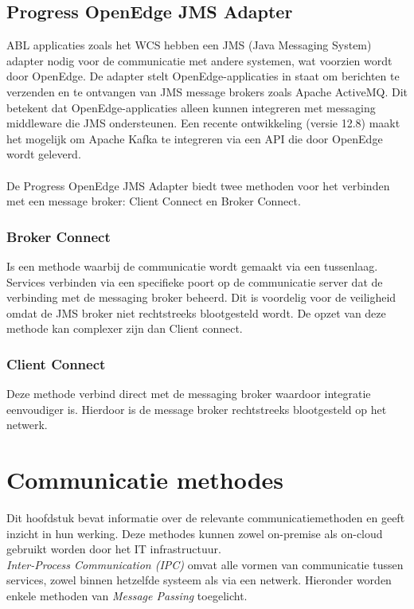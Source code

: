 \subsection{Progress OpenEdge JMS Adapter}
ABL applicaties zoals het WCS hebben een JMS (Java Messaging System) adapter nodig voor de communicatie met andere systemen, wat voorzien wordt door OpenEdge.
De adapter stelt OpenEdge-applicaties in staat om berichten te verzenden en te ontvangen van JMS message brokers zoals Apache ActiveMQ. 
Dit betekent dat OpenEdge-applicaties alleen kunnen integreren met messaging middleware die JMS ondersteunen. 
Een recente ontwikkeling (versie 12.8) maakt het mogelijk om Apache Kafka te integreren via een API die door OpenEdge wordt geleverd.
\\\\
De Progress OpenEdge JMS Adapter biedt twee methoden voor het verbinden met een message broker: Client Connect en Broker Connect.
\subsubsection{Broker Connect}
Is een methode waarbij de communicatie wordt gemaakt via een tussenlaag. Services verbinden via een specifieke poort op de communicatie server
dat de verbinding met de messaging broker beheerd. Dit is voordelig voor de veiligheid omdat de JMS broker niet rechtstreeks blootgesteld wordt.
De opzet van deze methode kan complexer zijn dan Client connect.

\subsubsection{Client Connect}
Deze methode verbind direct met de messaging broker waardoor integratie eenvoudiger is. 
Hierdoor is de message broker rechtstreeks blootgesteld op het netwerk.

\section{Communicatie methodes}
Dit hoofdstuk bevat informatie over de relevante communicatiemethoden en geeft inzicht in hun werking.
Deze methodes kunnen zowel on-premise als on-cloud gebruikt worden door het IT infrastructuur.
\\
\emph{Inter-Process Communication (IPC)} omvat alle vormen van communicatie tussen services, 
zowel binnen hetzelfde systeem als via een netwerk. 
Hieronder worden enkele methoden van \emph{Message Passing} toegelicht.

